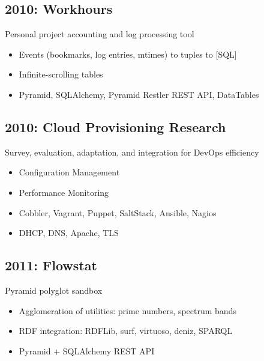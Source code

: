 \documentclass[letter,,openany,oneside]{sphinxhowto}
\begin{document}
\subsection{2010: Workhours}
\label{resume:workhours}
\begin{DUlineblock}{0em}
\item[] Personal project accounting and log processing tool
\end{DUlineblock}
\begin{itemize}
\item {} 
Events (bookmarks, log entries, mtimes) to tuples to {[}SQL{]}

\item {} 
Infinite-scrolling tables

\item {} 
Pyramid, SQLAlchemy, Pyramid Restler REST API, DataTables

\end{itemize}


\subsection{2010: Cloud Provisioning Research}
\label{resume:cloud-provisioning-research}
\begin{DUlineblock}{0em}
\item[] Survey, evaluation, adaptation, and integration for DevOps efficiency
\end{DUlineblock}
\begin{itemize}
\item {} 
Configuration Management

\item {} 
Performance Monitoring

\item {} 
Cobbler, Vagrant, Puppet, SaltStack, Ansible, Nagios

\item {} 
DHCP, DNS, Apache, TLS

\end{itemize}


\subsection{2011: Flowstat}
\label{resume:flowstat}
\begin{DUlineblock}{0em}
\item[] Pyramid polyglot sandbox
\end{DUlineblock}
\begin{itemize}
\item {} 
Agglomeration of utilities: prime numbers, spectrum bands

\item {} 
RDF integration: RDFLib, surf, virtuoso, deniz, SPARQL

\item {} 
Pyramid + SQLAlchemy REST API

\end{itemize}
\end{document}
